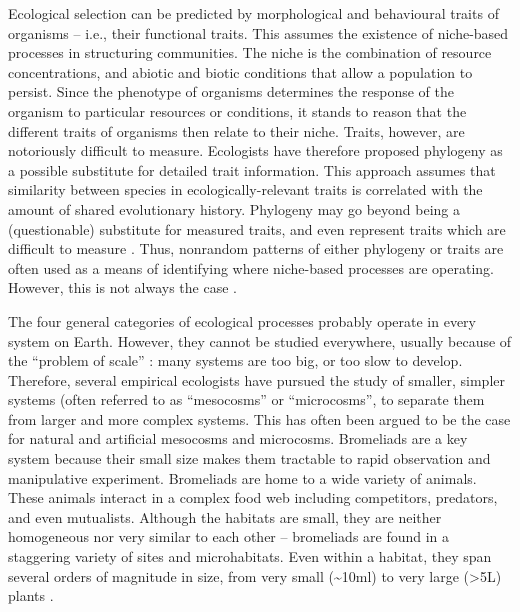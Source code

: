 Ecological selection can be predicted by morphological and behavioural
traits of organisms -- i.e., their functional traits. This assumes the
existence of niche-based processes in structuring communities. The niche
is the combination of resource concentrations, and abiotic and biotic
conditions that allow a population to persist. Since the phenotype of
organisms determines the response of the organism to particular
resources or conditions, it stands to reason that the different traits
of organisms then relate to their niche. Traits, however, are
notoriously difficult to measure. Ecologists have therefore proposed
phylogeny as a possible substitute for detailed trait information. This
approach assumes that similarity between species in
ecologically-relevant traits is correlated with the amount of shared
evolutionary history. Phylogeny may go beyond being a (questionable)
substitute for measured traits, and even represent traits which are
difficult to measure \citep{Cadotte2008, Srivastava2012c}. Thus,
nonrandom patterns of either phylogeny or traits are often used as a
means of identifying where niche-based processes are operating. However,
this is not always the case \citep{Mayfield2010}.

The four general categories of ecological processes probably operate in
every system on Earth. However, they cannot be studied everywhere,
usually because of the ``problem of scale'' \citep{Levin1992}: many
systems are too big, or too slow to develop. Therefore, several
empirical ecologists have pursued the study of smaller, simpler systems
(often referred to as ``mesocosms'' or ``microcosms'', to separate them
from larger and more complex systems. This has often been argued to be
the case for natural \citep{Srivastava2004a} and artificial
\citep{W.Fox2007} mesocosms and microcosms. Bromeliads are a key system
because their small size makes them tractable to rapid observation and
manipulative experiment. Bromeliads are home to a wide variety of
animals. These animals interact in a complex food web including
competitors, predators, and even mutualists. Although the habitats are
small, they are neither homogeneous nor very similar to each other --
bromeliads are found in a staggering variety of sites and microhabitats.
Even within a habitat, they span several orders of magnitude in size,
from very small (\textasciitilde{}10ml) to very large (\textgreater{}5L)
plants .

